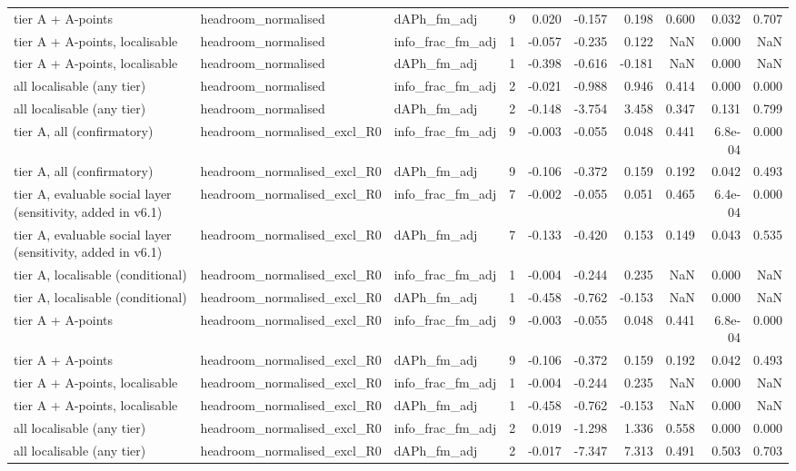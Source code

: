 \begin{tabular}{lllrrrrrrr}
tier A + A-points & headroom\_normalised & dAPh\_fm\_adj & 9 & 0.020 & -0.157 & 0.198 & 0.600 & 0.032 & 0.707 \\
tier A + A-points, localisable & headroom\_normalised & info\_frac\_fm\_adj & 1 & -0.057 & -0.235 & 0.122 & NaN & 0.000 & NaN \\
tier A + A-points, localisable & headroom\_normalised & dAPh\_fm\_adj & 1 & -0.398 & -0.616 & -0.181 & NaN & 0.000 & NaN \\
all localisable (any tier) & headroom\_normalised & info\_frac\_fm\_adj & 2 & -0.021 & -0.988 & 0.946 & 0.414 & 0.000 & 0.000 \\
all localisable (any tier) & headroom\_normalised & dAPh\_fm\_adj & 2 & -0.148 & -3.754 & 3.458 & 0.347 & 0.131 & 0.799 \\
tier A, all (confirmatory) & headroom\_normalised\_excl\_R0 & info\_frac\_fm\_adj & 9 & -0.003 & -0.055 & 0.048 & 0.441 & 6.8e-04 & 0.000 \\
tier A, all (confirmatory) & headroom\_normalised\_excl\_R0 & dAPh\_fm\_adj & 9 & -0.106 & -0.372 & 0.159 & 0.192 & 0.042 & 0.493 \\
tier A, evaluable social layer (sensitivity, added in v6.1) & headroom\_normalised\_excl\_R0 & info\_frac\_fm\_adj & 7 & -0.002 & -0.055 & 0.051 & 0.465 & 6.4e-04 & 0.000 \\
tier A, evaluable social layer (sensitivity, added in v6.1) & headroom\_normalised\_excl\_R0 & dAPh\_fm\_adj & 7 & -0.133 & -0.420 & 0.153 & 0.149 & 0.043 & 0.535 \\
tier A, localisable (conditional) & headroom\_normalised\_excl\_R0 & info\_frac\_fm\_adj & 1 & -0.004 & -0.244 & 0.235 & NaN & 0.000 & NaN \\
tier A, localisable (conditional) & headroom\_normalised\_excl\_R0 & dAPh\_fm\_adj & 1 & -0.458 & -0.762 & -0.153 & NaN & 0.000 & NaN \\
tier A + A-points & headroom\_normalised\_excl\_R0 & info\_frac\_fm\_adj & 9 & -0.003 & -0.055 & 0.048 & 0.441 & 6.8e-04 & 0.000 \\
tier A + A-points & headroom\_normalised\_excl\_R0 & dAPh\_fm\_adj & 9 & -0.106 & -0.372 & 0.159 & 0.192 & 0.042 & 0.493 \\
tier A + A-points, localisable & headroom\_normalised\_excl\_R0 & info\_frac\_fm\_adj & 1 & -0.004 & -0.244 & 0.235 & NaN & 0.000 & NaN \\
tier A + A-points, localisable & headroom\_normalised\_excl\_R0 & dAPh\_fm\_adj & 1 & -0.458 & -0.762 & -0.153 & NaN & 0.000 & NaN \\
all localisable (any tier) & headroom\_normalised\_excl\_R0 & info\_frac\_fm\_adj & 2 & 0.019 & -1.298 & 1.336 & 0.558 & 0.000 & 0.000 \\
all localisable (any tier) & headroom\_normalised\_excl\_R0 & dAPh\_fm\_adj & 2 & -0.017 & -7.347 & 7.313 & 0.491 & 0.503 & 0.703 \\
\bottomrule
\end{tabular}
